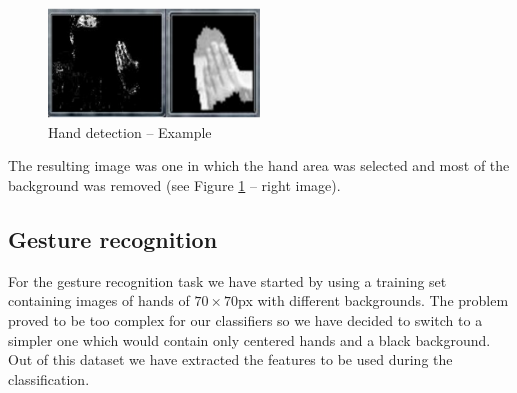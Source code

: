 \documentclass[a4paper, 11pt, twocolumn]{article}
\begin{document}
		\begin{figure}[!hbtp]
		   \centering
		   \includegraphics[width=0.5\textwidth]{hands.png}
			\caption{Hand detection -- Example}
			\label{img:skinProb}
	   	\end{figure}	
		\hspace*{10px}The resulting image was one in which the hand area was selected and most of the background was removed (see Figure \ref{img:skinProb} -- right image).
        \subsection{Gesture recognition}
		For the gesture recognition task we have started by using a training set containing images of hands of \emph{$70\times 70$}px with different backgrounds. The problem proved to be too complex for our classifiers so we have decided to switch to a simpler one which would contain only centered hands and a black background.\\ 
		\hspace*{10px}Out of this dataset we have extracted the features to be used during the classification.
		\label{sec:Meth_clssifyHands}
\end{document}

